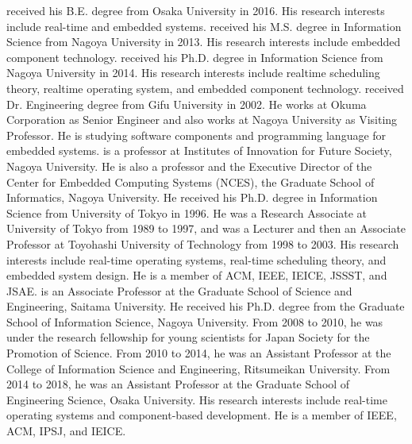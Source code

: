 \begin{biography}
{
received his B.E. degree from Osaka University in 2016.
His research interests include real-time and embedded systems\@.
}
{
received his M.S. degree in Information Science from Nagoya University in 2013.
His research interests include embedded component technology\@.
}
{
received his Ph.D. degree in Information Science from Nagoya University in 2014.
His research interests include realtime scheduling theory, realtime operating system, and embedded component technology\@.
}
{
received Dr. Engineering degree from Gifu University in 2002.
He works at Okuma Corporation as Senior Engineer and also works at Nagoya University as Visiting Professor.
He is studying software components and programming language for embedded systems\@.
}
{
is a professor at Institutes of Innovation for Future Society, Nagoya University.
He is also a professor and the Executive Director of the Center for Embedded Computing Systems (NCES), the Graduate School of Informatics, Nagoya University.
He received his Ph.D. degree in Information Science from University of Tokyo in 1996.
He was a Research Associate at University of Tokyo from 1989 to 1997, and was a Lecturer and then an Associate Professor at Toyohashi University of Technology from 1998 to 2003.
His research interests include real-time operating systems, real-time scheduling theory, and embedded system design.
He is a member of ACM, IEEE, IEICE, JSSST, and JSAE\@.
}
{
is an Associate Professor at the Graduate School of Science and Engineering, Saitama University.
He received his Ph.D. degree from the Graduate School of Information Science, Nagoya University. 
From 2008 to 2010, he was under the research fellowship for young scientists for Japan Society for the Promotion of Science. 
From 2010 to 2014, he was an Assistant Professor at the College of Information Science and Engineering, Ritsumeikan University. 
From 2014 to 2018, he was an Assistant Professor at the Graduate School of Engineering Science, Osaka University. 
His research interests include real-time operating systems and component-based development.
He is a member of IEEE, ACM, IPSJ, and IEICE\@.
}


\end{biography}
